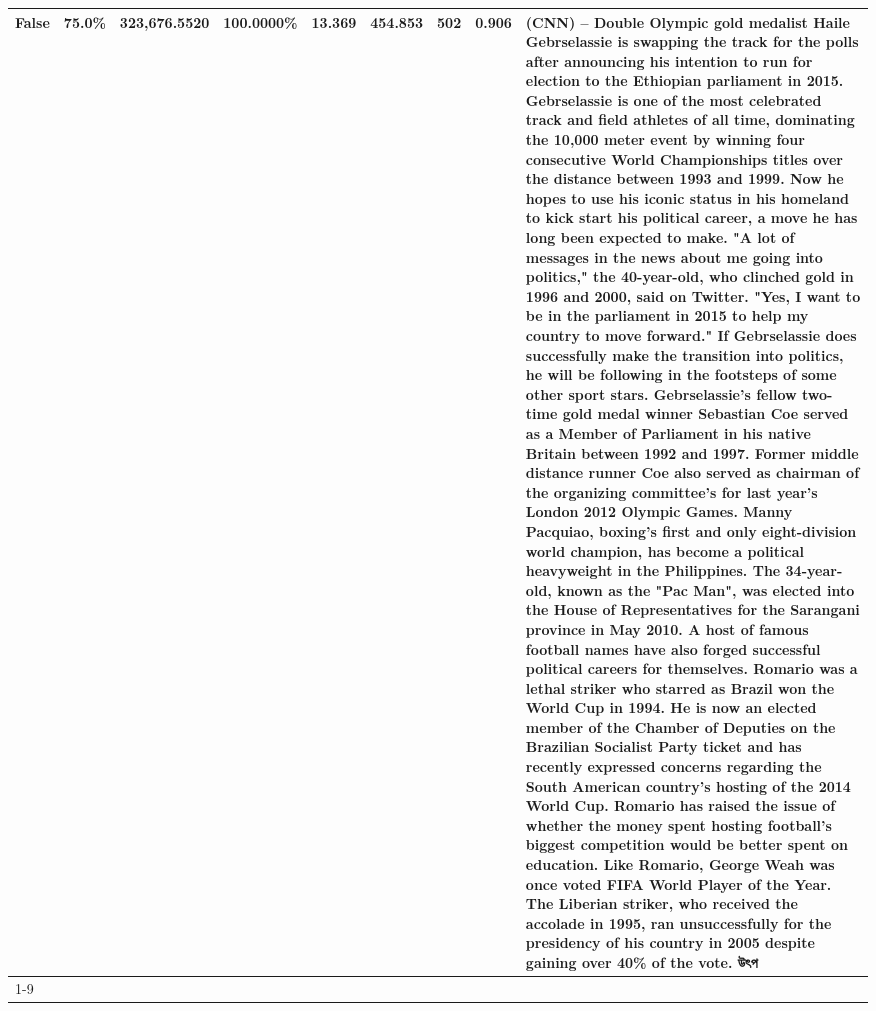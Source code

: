 \begin{table}[H]
{\begin{tabular}{lllrlllll}
False & 75.0\% & 323,676.5520 & \bfseries \color{red} 100.0000\% & 13.369 & 454.853 & 502 & 0.906 & (CNN) -- Double Olympic gold medalist Haile Gebrselassie is swapping the track for the polls after announcing his intention to run for election to the Ethiopian parliament in 2015. Gebrselassie is one of the most celebrated track and field athletes of all time, dominating the 10,000 meter event by winning four consecutive World Championships titles over the distance between 1993 and 1999. Now he hopes to use his iconic status in his homeland to kick start his political career, a move he has long been expected to make. "A lot of messages in the news about me going into politics," the 40-year-old, who clinched gold in 1996 and 2000, said on Twitter. "Yes, I want to be in the parliament in 2015 to help my country to move forward." If Gebrselassie does successfully make the transition into politics, he will be following in the footsteps of some other sport stars. Gebrselassie's fellow two-time gold medal winner Sebastian Coe served as a Member of Parliament in his native Britain between 1992 and 1997. Former middle distance runner Coe also served as chairman of the organizing committee's for last year's London 2012 Olympic Games. Manny Pacquiao, boxing's first and only eight-division world champion, has become a political heavyweight in the Philippines. The 34-year-old, known as the "Pac Man", was elected into the House of Representatives for the Sarangani province in May 2010. A host of famous football names have also forged successful political careers for themselves. Romario was a lethal striker who starred as Brazil won the World Cup in 1994. He is now an elected member of the Chamber of Deputies on the Brazilian Socialist Party ticket and has recently expressed concerns regarding the South American country's hosting of the 2014 World Cup. Romario has raised the issue of whether the money spent hosting football's biggest competition would be better spent on education. Like Romario, George Weah was once voted FIFA World Player of the Year. The Liberian striker, who received the accolade in 1995, ran unsuccessfully for the presidency of his country in 2005 despite gaining over 40\% of the vote. উৎপ \\
\cline{1-9}

\end{tabular}}
\end{table}
